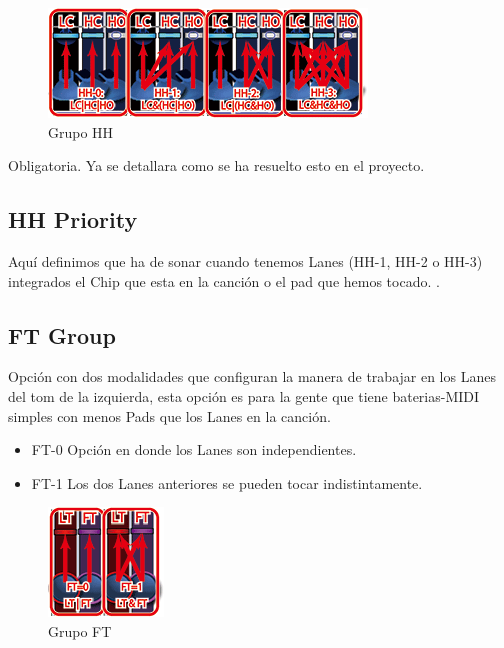 \documentclass[a4paper,11pt,oneside]{book}
\begin{document}
\begin{figure}[H]
\begin{center}
\includegraphics[scale=1.0]{Imagenes/HH_group.png}
\caption{Grupo HH}
\label{Grupo HH}
\end{center}
\end{figure}

Obligatoria. Ya se detallara como se ha resuelto esto en el proyecto.

\subsection{HH Priority}
Aquí definimos que ha de sonar cuando tenemos \gls{Lanes} (HH-1, HH-2 o HH-3) integrados el Chip que esta en la canción o el pad que hemos tocado.
.
\subsection{FT Group}
Opción con dos modalidades que configuran la manera de trabajar en los \gls{Lanes} del tom de la izquierda, esta opción es para la gente que tiene baterias-MIDI simples con menos \gls{Pads} que los \gls{Lanes} en la canción.
\begin{itemize}
  \item FT-0 Opción en donde los \gls{Lanes} son independientes.
  \item FT-1 Los dos \gls{Lanes} anteriores se pueden tocar indistintamente.
\end{itemize}


\begin{figure}[H]
\begin{center}
\includegraphics[scale=1.0]{Imagenes/FT_group.png}
\caption{Grupo FT}
\label{Grupo FT}
\end{center}
\end{figure}
\end{document}
